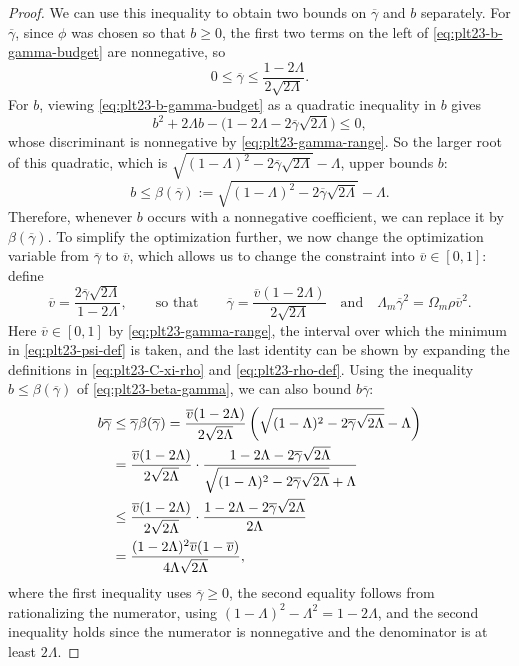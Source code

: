 \documentclass[11pt]{article}
\numberwithin{equation}{section}
\begin{document}
\begin{proof}
  We can use this inequality to obtain two bounds on $\overline\gamma$ and $b$ separately.
  For $\overline\gamma$, since $\phi$ was chosen so that $b\ge0$, the first two terms on the left of \eqref{eq:plt23-b-gamma-budget} are nonnegative, so
  \begin{equation}\label{eq:plt23-gamma-range}
    0\le\overline\gamma\le\frac{1-2\Lambda}{2\sqrt{2\Lambda}}.
  \end{equation}
  For $b$, viewing \eqref{eq:plt23-b-gamma-budget} as a quadratic inequality in $b$ gives
  \[
    b^2+2\Lambda b-\bigl(1-2\Lambda-2\overline\gamma\sqrt{2\Lambda}\bigr)\le0,
  \]
  whose discriminant is nonnegative by \eqref{eq:plt23-gamma-range}.
  So the larger root of this quadratic, which is $\sqrt{(1-\Lambda)^2-2\overline\gamma\sqrt{2\Lambda}}-\Lambda$, upper bounds $b$:
  \begin{equation}\label{eq:plt23-beta-gamma}
    b\le\beta(\overline\gamma):=
    \sqrt{(1-\Lambda)^2-2\overline\gamma\sqrt{2\Lambda}}-\Lambda.
  \end{equation}
  Therefore, whenever $b$ occurs with a nonnegative coefficient, we can replace it by $\beta(\overline\gamma)$.
  To simplify the optimization further, we now change the optimization variable from $\overline\gamma$ to $\overline v$, which allows us to change the constraint into $\overline v\in[0,1]$: define
  \begin{equation}\label{eq:plt23-v-def}
    \overline v=\frac{2\overline\gamma\sqrt{2\Lambda}}{1-2\Lambda},
    \qquad\text{so that}\qquad
    \overline\gamma=\frac{\overline v(1-2\Lambda)}{2\sqrt{2\Lambda}}
    \quad\text{and}\quad
    \Lambda_m\overline\gamma^2=\Omega_m\rho\overline v^2.
  \end{equation}
  Here $\overline v \in [0,1]$ by \eqref{eq:plt23-gamma-range}, the interval over which the minimum in \eqref{eq:plt23-psi-def} is taken, and the last identity can be shown by expanding the definitions in \eqref{eq:plt23-C-xi-rho} and \eqref{eq:plt23-rho-def}.
  Using the inequality $b\le\beta(\overline\gamma)$ of \eqref{eq:plt23-beta-gamma}, we can also bound $b\overline\gamma$:
  \begin{align}
    b\overline\gamma
    &\le\overline\gamma\beta(\overline\gamma)
    =\frac{\overline v(1-2\Lambda)}{2\sqrt{2\Lambda}}
      \left(\sqrt{(1-\Lambda)^2-2\overline\gamma\sqrt{2\Lambda}}-\Lambda\right)
    \notag\\
    &=\frac{\overline v(1-2\Lambda)}{2\sqrt{2\Lambda}}
      \cdot\frac{1-2\Lambda-2\overline\gamma\sqrt{2\Lambda}}
      {\sqrt{(1-\Lambda)^2-2\overline\gamma\sqrt{2\Lambda}}+\Lambda}
    \notag\\
    &\le\frac{\overline v(1-2\Lambda)}{2\sqrt{2\Lambda}}
      \cdot\frac{1-2\Lambda-2\overline\gamma\sqrt{2\Lambda}}{2\Lambda}
    \notag\\
    &=\frac{(1-2\Lambda)^2\overline v(1-\overline v)}{4\Lambda\sqrt{2\Lambda}},
    \label{eq:plt23-gamma-beta-v}
  \end{align}
  where the first inequality uses $\overline\gamma\ge0$, the second equality follows from rationalizing the numerator, using $(1-\Lambda)^2-\Lambda^2=1-2\Lambda$, and the second inequality holds since the numerator is nonnegative and the denominator is at least $2\Lambda$.


\end{proof}
\end{document}
